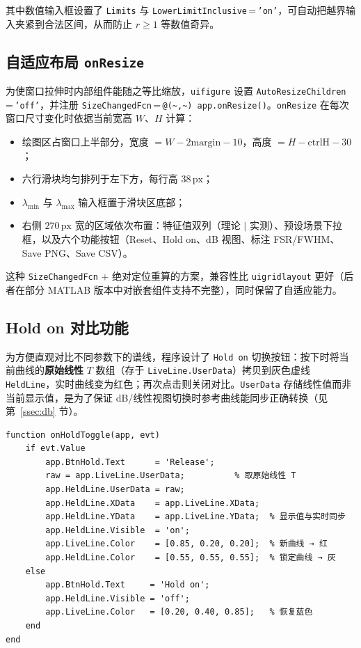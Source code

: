 \documentclass[10.5pt]{config}
\begin{document}
其中数值输入框设置了 \texttt{Limits} 与 \texttt{LowerLimitInclusive}\,=\,\texttt{'on'}，可自动把越界输入夹紧到合法区间，从而防止 $r \ge 1$ 等数值奇异。

\subsection{自适应布局 \texttt{onResize}}

为使窗口拉伸时内部组件能随之等比缩放，\texttt{uifigure} 设置 \texttt{Auto\-Resize\-Children}\,=\,\texttt{'off'}，并注册 \texttt{Size\-Changed\-Fcn}\,=\,\texttt{@(\textasciitilde,\textasciitilde)\,app.\-on\-Resize()}。\texttt{onResize} 在每次窗口尺寸变化时依据当前宽高 $W$、$H$ 计算：

\begin{itemize}
    \item 绘图区占窗口上半部分，宽度 $= W - 2\text{margin} - 10$，高度 $= H - \text{ctrlH} - 30$；
    \item 六行滑块均匀排列于左下方，每行高 $38\,\mathrm{px}$；
    \item $\lambda_{\min}$ 与 $\lambda_{\max}$ 输入框置于滑块区底部；
    \item 右侧 $270\,\mathrm{px}$ 宽的区域依次布置：特征值双列（理论 $\mid$ 实测）、预设场景下拉框，以及六个功能按钮（Reset、Hold on、dB 视图、标注 FSR/FWHM、Save PNG、Save CSV）。
\end{itemize}

这种 \texttt{SizeChangedFcn} + 绝对定位重算的方案，兼容性比 \texttt{uigridlayout} 更好（后者在部分 MATLAB 版本中对嵌套组件支持不完整），同时保留了自适应能力。

\subsection{Hold on 对比功能}

为方便直观对比不同参数下的谱线，程序设计了 \texttt{Hold on} 切换按钮：按下时将当前曲线的\textbf{原始线性} $T$ 数组（存于 \texttt{LiveLine.UserData}）拷贝到灰色虚线 \texttt{HeldLine}，实时曲线变为红色；再次点击则关闭对比。\texttt{UserData} 存储线性值而非当前显示值，是为了保证 dB/线性视图切换时参考曲线能同步正确转换（见第~\ref{ssec:db} 节）。

\begin{listing}[H]
\begin{verbatim}
function onHoldToggle(app, evt)
    if evt.Value
        app.BtnHold.Text      = 'Release';
        raw = app.LiveLine.UserData;          % 取原始线性 T
        app.HeldLine.UserData = raw;
        app.HeldLine.XData    = app.LiveLine.XData;
        app.HeldLine.YData    = app.LiveLine.YData;  % 显示值与实时同步
        app.HeldLine.Visible  = 'on';
        app.LiveLine.Color    = [0.85, 0.20, 0.20];  % 新曲线 → 红
        app.HeldLine.Color    = [0.55, 0.55, 0.55];  % 锁定曲线 → 灰
    else
        app.BtnHold.Text     = 'Hold on';
        app.HeldLine.Visible = 'off';
        app.LiveLine.Color   = [0.20, 0.40, 0.85];   % 恢复蓝色
    end
end
\end{verbatim}
\caption{\texttt{onHoldToggle}：锁定参考曲线并保存原始线性 $T$ 供视图切换用}
\end{listing}
\end{document}
